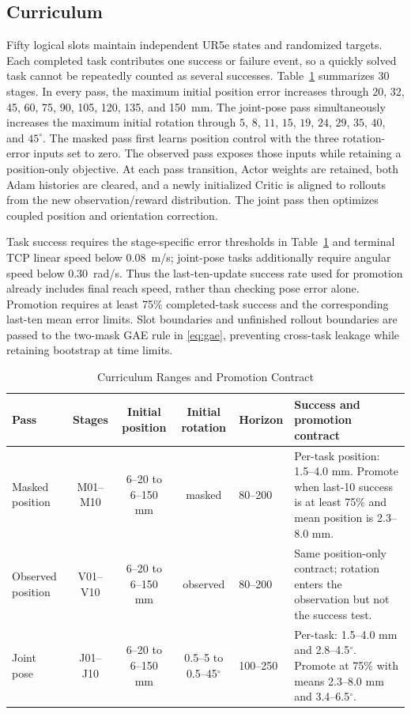 \documentclass[conference]{IEEEtran}
\begin{document}
\subsection{Curriculum}

Fifty logical slots maintain independent UR5e states and randomized targets. Each completed task contributes one success or failure event, so a quickly solved task cannot be repeatedly counted as several successes. Table~\ref{tab:curriculum} summarizes 30 stages. In every pass, the maximum initial position error increases through 20, 32, 45, 60, 75, 90, 105, 120, 135, and 150~mm. The joint-pose pass simultaneously increases the maximum initial rotation through $5$, $8$, $11$, $15$, $19$, $24$, $29$, $35$, $40$, and $45^{\circ}$. The masked pass first learns position control with the three rotation-error inputs set to zero. The observed pass exposes those inputs while retaining a position-only objective. At each pass transition, Actor weights are retained, both Adam histories are cleared, and a newly initialized Critic is aligned to rollouts from the new observation/reward distribution. The joint pass then optimizes coupled position and orientation correction.

Task success requires the stage-specific error thresholds in Table~\ref{tab:curriculum} and terminal TCP linear speed below 0.08~m/s; joint-pose tasks additionally require angular speed below 0.30~rad/s. Thus the last-ten-update success rate used for promotion already includes final reach speed, rather than checking pose error alone. Promotion requires at least 75\% completed-task success and the corresponding last-ten mean error limits. Slot boundaries and unfinished rollout boundaries are passed to the two-mask GAE rule in \eqref{eq:gae}, preventing cross-task leakage while retaining bootstrap at time limits.

\begin{table}[t]
\caption{Curriculum Ranges and Promotion Contract}
\label{tab:curriculum}
\centering
\footnotesize
\setlength{\tabcolsep}{3pt}
\begin{tabular}{@{}lccclp{5.3cm}@{}}
\toprule
Pass & Stages & Initial position & Initial rotation & Horizon & Success and promotion contract \\
\midrule
Masked position & M01--M10 & 6--20 to 6--150 mm & masked & 80--200 & Per-task position: 1.5--4.0 mm. Promote when last-10 success is at least 75\% and mean position is 2.3--8.0 mm. \\
Observed position & V01--V10 & 6--20 to 6--150 mm & observed & 80--200 & Same position-only contract; rotation enters the observation but not the success test. \\
Joint pose & J01--J10 & 6--20 to 6--150 mm & 0.5--5 to 0.5--45$^{\circ}$ & 100--250 & Per-task: 1.5--4.0 mm and 2.8--4.5$^{\circ}$. Promote at 75\% with means 2.3--8.0 mm and 3.4--6.5$^{\circ}$. \\
\bottomrule
\end{tabular}
\end{table}
\end{document}
